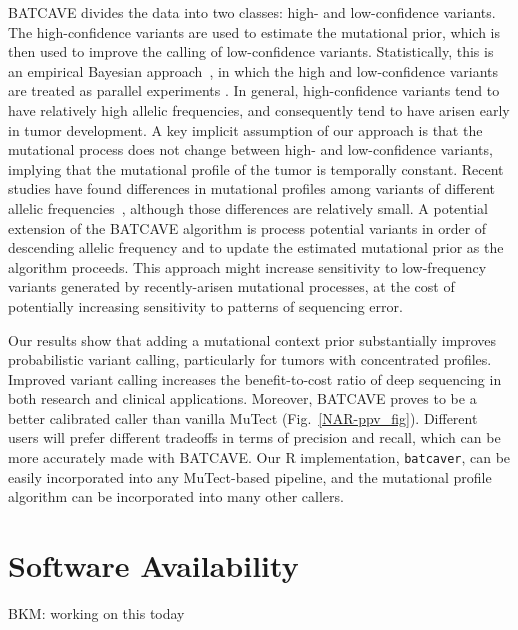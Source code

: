 \documentclass[a4,center,fleqn]{NAR}
\newcommand{\bkmcomment}[1]{{\color{blue}BKM: #1}}
\newcommand{\batcave}{BATCAVE\xspace}
\begin{document}
\batcave divides the data into two classes: high- and low-confidence variants.
The high-confidence variants are used to estimate the mutational prior, which is then used to improve the calling of low-confidence variants.
Statistically, this is an empirical Bayesian approach~\citep{Robbins1954}, in which the high and low-confidence variants are treated as parallel experiments \citep{Morris1983,Efron2014}. 
In general, high-confidence variants tend to have relatively high allelic frequencies, and consequently tend to have arisen early in tumor development.
A key implicit assumption of our approach is that the mutational process does not change between high- and low-confidence variants, implying that the mutational profile of the tumor is temporally constant.
Recent studies have found differences in mutational profiles among variants of different allelic frequencies~\citep{Rubanova2018a}, although those differences are relatively small.
A potential extension of the \batcave algorithm is process potential variants in order of descending allelic frequency and to update the estimated mutational prior as the algorithm proceeds.
This approach might increase sensitivity to low-frequency variants generated by recently-arisen mutational processes, at the cost of potentially increasing sensitivity to patterns of sequencing error.


Our results show that adding a mutational context prior substantially improves probabilistic variant calling, particularly for tumors with concentrated profiles.
Improved variant calling increases the benefit-to-cost ratio of deep sequencing in both research and clinical applications.
Moreover, \batcave proves to be a better calibrated caller than vanilla MuTect (Fig.~\ref{NAR-ppv_fig}).
Different users will prefer different tradeoffs in terms of precision and recall, which can be more accurately made with \batcave.
Our R implementation, \texttt{batcaver}, can be easily incorporated into any MuTect-based pipeline, and the mutational profile algorithm can be incorporated into many other callers.


\section{Software Availability}
\bkmcomment{working on this today}
\end{document}

